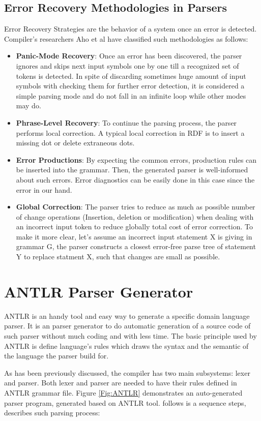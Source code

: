 {{{{{\subsection{Error Recovery Methodologies in Parsers}
Error Recovery Strategies are the behavior of a system once an error is detected. Compiler's researchers Aho et al \cite{Aho2006}  have classified such methodologies as follows:
\begin{itemize}
	\item \textbf{Panic-Mode Recovery}: Once an error has been discovered, the parser ignores and skips next input symbols one by one till a recognized set of tokens is detected. In spite of discarding sometimes huge amount of input symbols with checking them for further error detection, it is considered a simple parsing mode and do not fall in an infinite loop while other modes may do.
	\item \textbf{Phrase-Level Recovery}: To continue the parsing process, the parser performs local correction. A typical local correction in RDF is to insert a missing dot or delete extraneous dots.
	\item \textbf{Error Productions}: By expecting the common errors, production rules can be inserted into the grammar. Then, the generated parser is well-informed about such errors. Error diagnostics can be easily done in this case since the error in our hand.
	\item \textbf{Global Correction}: The parser tries to reduce as much as possible number of change operations (Insertion, deletion or modification) when dealing with an incorrect input token to reduce globally total cost of error correction. To make it more clear, let's assume an incorrect input statement X is giving in grammar G, the parser constructs a closest error-free parse tree of statement Y to replace statment X, such that changes are small as possible. 
\end{itemize}


\section{ANTLR Parser Generator }
ANTLR is an handy tool and easy way to generate a specific domain language parser. It is an parser generator to do automatic generation of a source code of such parser without much coding and with less time. The basic principle used by ANTLR is define language's rules which draws the syntax and the semantic of the language the parser build for. 

\vspace{5mm} %
\par
 As has been previously discussed, the compiler has two main subsystems: lexer and parser. Both lexer and parser are needed to have their rules defined in ANTLR grammar file.  Figure \ref*{Fig:ANTLR} demonstrates an auto-generated parser program, generated based on ANTLR tool. follows is a sequence steps, describes such parsing process:

}}}}}
